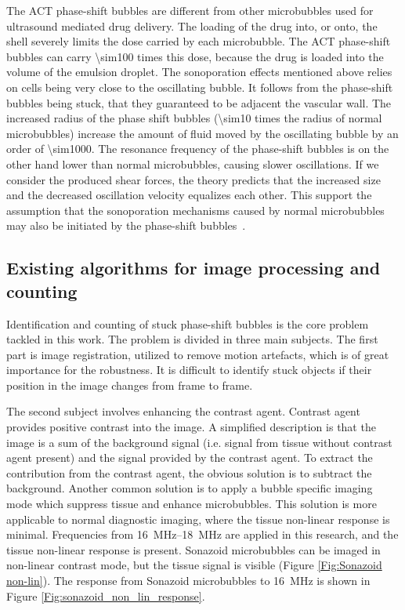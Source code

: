 The ACT\texttrademark{} phase-shift bubbles are different from other microbubbles used for ultrasound mediated drug delivery. The loading of the drug into, or onto, the shell severely limits the dose carried by each microbubble. The ACT\texttrademark{} phase-shift bubbles can carry \num{\sim100} times this dose, because the drug is loaded into the volume of the emulsion droplet. The sonoporation effects mentioned above relies on cells being very close to the oscillating bubble. It follows from the phase-shift bubbles being stuck, that they guaranteed to be adjacent the vascular wall. The increased radius of the phase shift bubbles (\num{\sim10} times the radius of normal microbubbles) increase the amount of fluid moved by the oscillating bubble by an order of \num{\sim1000}. The resonance frequency of the phase-shift bubbles is on the other hand lower than normal microbubbles, causing slower oscillations. If we consider the produced shear forces, the theory predicts that the increased size and the decreased oscillation velocity equalizes each other. This support the assumption that the sonoporation mechanisms caused by normal microbubbles may also be initiated by the phase-shift bubbles~\cite{Healey_pc}.


  

\clearpage
\subsection{Existing algorithms for image processing and counting}
\label{existing algorithms}
Identification and counting of stuck phase-shift bubbles is the core problem tackled in this work. The problem is divided in three main subjects. The first part is image registration, utilized to remove motion artefacts, which is of great importance for the robustness. It is difficult to identify stuck objects if their position in the image changes from frame to frame.

The second subject involves enhancing the contrast agent. Contrast agent provides positive contrast into the image. A simplified description is that the image is a sum of the background signal (i.e. signal from tissue without contrast agent present) and the signal provided by the contrast agent. To extract the contribution from the contrast agent, the obvious solution is to subtract the background. Another common solution is to apply a bubble specific imaging mode which suppress tissue and enhance microbubbles. This solution is more applicable to normal diagnostic imaging, where the tissue non-linear response is minimal. Frequencies from \SIrange{16}{18}{\mega\hertz} are applied in this research, and the tissue non-linear response is present. Sonazoid\texttrademark{} microbubbles can be imaged in non-linear contrast mode, but the tissue signal is visible (Figure \ref{Fig:Sonazoid non-lin}). The response from Sonazoid\texttrademark{} microbubbles to \SI{16}{\mega\hertz} is shown in Figure \ref{Fig:sonazoid_non_lin_response}.


